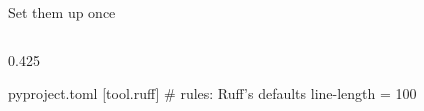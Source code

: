 \begin{frame}[fragile,source={Astral (2026), Ruff: editor setup · Microsoft (2026), Mypy Type Checker; Pylance README}]{Set them up once}
  \begin{columns}[T,onlytextwidth]
    \begin{column}{0.425\textwidth}
\begin{codefile}[style=sh,basicstyle=\ttfamily\fontsize{7}{8.4}\selectfont]{pyproject.toml}
[tool.ruff]  # rules: Ruff's defaults
line-length = 100


\end{codefile}
\end{column}
\end{columns}
\end{frame}
